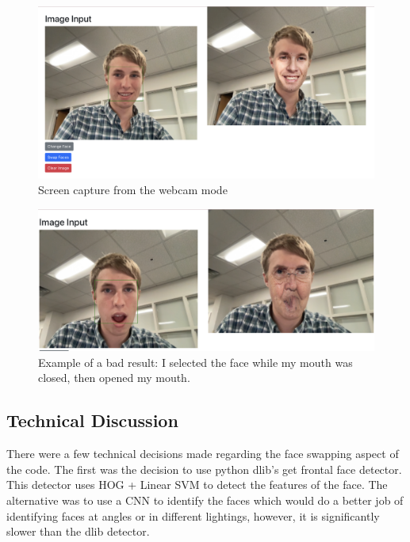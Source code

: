 \begin{figure}[t]
    \centering
    \includegraphics[width=\linewidth]{Screenshot_2022-05-09 16.14.04.png}
    \caption{Screen capture from the webcam mode}
    \label{fig:result5}
\end{figure}

\begin{figure}[t]
    \centering
    \includegraphics[width=\linewidth]{Screenshot_2022-05-09 16.29.35.png}
    \caption{Example of a bad result: I selected the face while my mouth was closed, then opened my mouth.}
    \label{fig:result6}
\end{figure}

\subsection{Technical Discussion}


There were a few technical decisions made regarding the face swapping aspect of the code.
The first was the decision to use python dlib's get frontal face detector. This detector uses HOG + Linear SVM
to detect the features of the face. The alternative was to use a CNN to identify the faces which would do a better
job of identifying faces at angles or in different lightings, however, it is significantly slower than the dlib detector.

